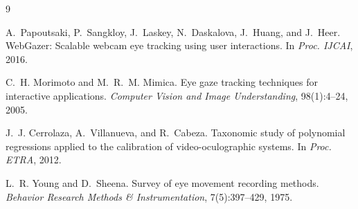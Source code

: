 \documentclass[10pt,twocolumn]{article}
\begin{document}

\begin{thebibliography}{9}

A.~Papoutsaki, P.~Sangkloy, J.~Laskey, N.~Daskalova, J.~Huang, and J.~Heer.
\newblock WebGazer: Scalable webcam eye tracking using user interactions.
\newblock In \textit{Proc. IJCAI}, 2016.

C.~H. Morimoto and M.~R.~M. Mimica.
\newblock Eye gaze tracking techniques for interactive applications.
\newblock \textit{Computer Vision and Image Understanding}, 98(1):4--24, 2005.

J.~J. Cerrolaza, A.~Villanueva, and R.~Cabeza.
\newblock Taxonomic study of polynomial regressions applied to the calibration of video-oculographic systems.
\newblock In \textit{Proc. ETRA}, 2012.

L.~R. Young and D.~Sheena.
\newblock Survey of eye movement recording methods.
\newblock \textit{Behavior Research Methods \& Instrumentation}, 7(5):397--429, 1975.

\end{thebibliography}
\end{document}
